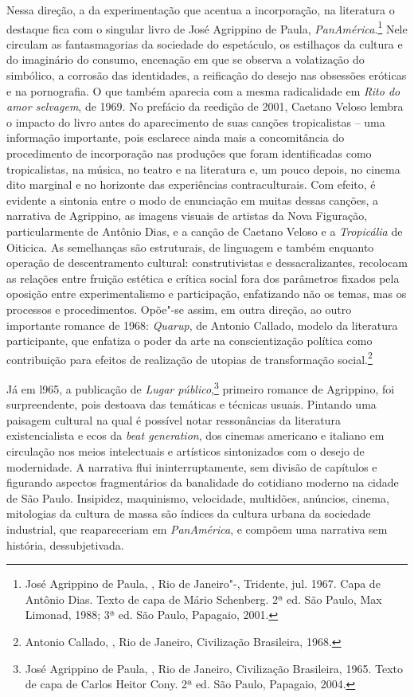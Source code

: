 Nessa direção, a da experimentação que acentua a incorporação, na
literatura o destaque fica com o singular livro de José Agrippino de
Paula, \emph{PanAmérica}.\footnote{José Agrippino de Paula,
  {}, Rio de Janeiro"-, Tridente, jul. 1967. Capa de
  Antônio Dias. Texto de capa de Mário Schenberg. 2ª ed. São Paulo, Max
  Limonad, 1988; 3ª ed. São Paulo, Papagaio, 2001.} Nele circulam as
fantasmagorias da sociedade do espetáculo, os estilhaços da cultura e do
imaginário do consumo, encenação em que se observa a volatização do
simbólico, a corrosão das identidades, a reificação do desejo nas
obsessões eróticas e na pornografia. O que também aparecia com a mesma
radicalidade em \emph{Rito do amor selvagem}, de 1969. No prefácio da
reedição de 2001, Caetano Veloso lembra o impacto do livro antes do
aparecimento de suas canções tropicalistas -- uma informação importante,
pois esclarece ainda mais a concomitância do procedimento de
incorporação nas produções que foram identificadas como tropicalistas,
na música, no teatro e na literatura e, um pouco depois, no cinema dito
marginal e no horizonte das experiências contraculturais. Com efeito, é
evidente a sintonia entre o modo de enunciação em muitas dessas canções,
a narrativa de Agrippino, as imagens visuais de artistas da Nova
Figuração, particularmente de Antônio Dias, e a canção de Caetano Veloso
e a \emph{Tropicália} de Oiticica. As semelhanças são estruturais, de
linguagem e também enquanto operação de descentramento cultural:
construtivistas e dessacralizantes, recolocam as relações entre fruição
estética e crítica social fora dos parâmetros fixados pela oposição
entre experimentalismo e participação, enfatizando não os temas, mas os
processos e procedimentos. Opõe"-se assim, em outra direção, ao outro
importante romance de 1968: \emph{Quarup}, de Antonio Callado, modelo da
literatura participante, que enfatiza o poder da arte na conscientização
política como contribuição para efeitos de realização de utopias de
transformação social.\footnote{Antonio Callado, {}, Rio de
  Janeiro, Civilização Brasileira, 1968.}

Já em l965, a publicação de \emph{Lugar público},\footnote{José
  Agrippino de Paula, {}, Rio de Janeiro, Civilização
  Brasileira, 1965. Texto de capa de Carlos Heitor Cony. 2ª ed. São
  Paulo, Papagaio, 2004.} primeiro romance de Agrippino, foi
surpreendente, pois destoava das temáticas e técnicas usuais. Pintando
uma paisagem cultural na qual é possível notar ressonâncias da
literatura existencialista e ecos da \emph{beat generation}, dos cinemas
americano e italiano em circulação nos meios intelectuais e artísticos
sintonizados com o desejo de modernidade. A narrativa flui
ininterruptamente, sem divisão de capítulos e figurando aspectos
fragmentários da banalidade do cotidiano moderno na cidade de São Paulo.
Insipidez, maquinismo, velocidade, multidões, anúncios, cinema,
mitologias da cultura de massa são índices da cultura urbana da
sociedade industrial, que reapareceriam em \emph{PanAmérica}, e compõem
uma narrativa sem história, dessubjetivada.

